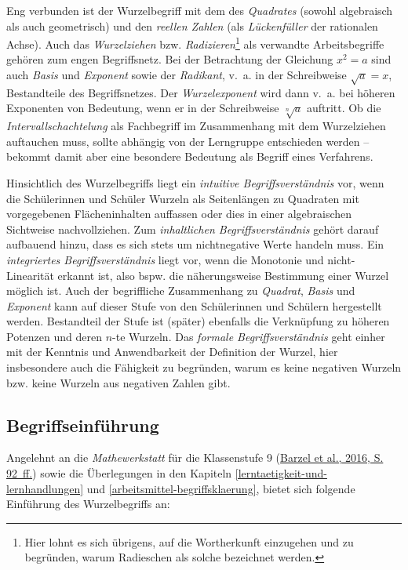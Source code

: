 \documentclass[
]{scrbook}
\theoremstyle{definition}
\theoremstyle{definition}
\theoremstyle{definition}
\theoremstyle{definition}
\theoremstyle{remark}
\begin{document}
Eng verbunden ist der Wurzelbegriff mit dem des \emph{Quadrates} (sowohl algebraisch als auch geometrisch) und den \emph{reellen Zahlen} (als \emph{Lückenfüller} der rationalen Achse). Auch das \emph{Wurzelziehen} bzw. \emph{Radizieren}\footnote{Hier lohnt es sich übrigens, auf die Wortherkunft einzugehen und zu begründen, warum Radieschen als solche bezeichnet werden.} als verwandte Arbeitsbegriffe gehören zum engen Begriffsnetz. Bei der Betrachtung der Gleichung \(x^2 = a\) sind auch \emph{Basis} und \emph{Exponent} sowie der \emph{Radikant}, v.~a. in der Schreibweise \(\sqrt{a} = x\), Bestandteile des Begriffsnetzes. Der \emph{Wurzelexponent} wird dann v.~a. bei höheren Exponenten von Bedeutung, wenn er in der Schreibweise \(\sqrt[n]{a}\) auftritt. Ob die \emph{Intervallschachtelung} als Fachbegriff im Zusammenhang mit dem Wurzelziehen auftauchen muss, sollte abhängig von der Lerngruppe entschieden werden -- bekommt damit aber eine besondere Bedeutung als Begriff eines Verfahrens.

Hinsichtlich des Wurzelbegriffs liegt ein \emph{intuitive Begriffsverständnis} vor, wenn die Schülerinnen und Schüler Wurzeln als Seitenlängen zu Quadraten mit vorgegebenen Flächeninhalten auffassen oder dies in einer algebraischen Sichtweise nachvollziehen. Zum \emph{inhaltlichen Begriffsverständnis} gehört darauf aufbauend hinzu, dass es sich stets um nichtnegative Werte handeln muss. Ein \emph{integriertes Begriffsverständnis} liegt vor, wenn die Monotonie und nicht-Linearität erkannt ist, also bspw. die näherungsweise Bestimmung einer Wurzel möglich ist. Auch der begriffliche Zusammenhang zu \emph{Quadrat}, \emph{Basis} und \emph{Exponent} kann auf dieser Stufe von den Schülerinnen und Schülern hergestellt werden. Bestandteil der Stufe ist (später) ebenfalls die Verknüpfung zu höheren Potenzen und deren \(n\)-te Wurzeln. Das \emph{formale Begriffsverständnis} geht einher mit der Kenntnis und Anwendbarkeit der Definition der Wurzel, hier insbesondere auch die Fähigkeit zu begründen, warum es keine negativen Wurzeln bzw. keine Wurzeln aus negativen Zahlen gibt.

\hypertarget{wurzel-begriffseinfuehrung}{%
\subsection{Begriffseinführung}\label{wurzel-begriffseinfuehrung}}

Angelehnt an die \emph{Mathewerkstatt} für die Klassenstufe 9 (\protect\hyperlink{ref-Barzel2016}{Barzel et al., 2016, S. 92~ff.}) sowie die Überlegungen in den Kapiteln \ref{lerntaetigkeit-und-lernhandlungen} und \ref{arbeitsmittel-begriffsklaerung}, bietet sich folgende Einführung des Wurzelbegriffs an:
\end{document}
